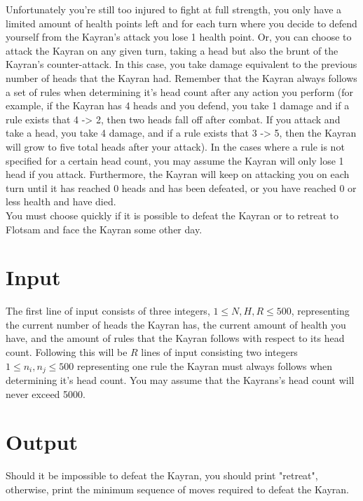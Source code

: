 \noindent Unfortunately you're still too injured to fight at full strength, you only have a limited amount of health
points left and for each turn where you decide to defend yourself from the Kayran's attack you lose 1 health point. Or,
you can choose to attack the Kayran on any given turn, taking a head but also the brunt of the Kayran's counter-attack.
In this case, you take damage equivalent to the previous number of heads that the Kayran had. Remember that the Kayran
always follows a set of rules when determining it's head count after any action you perform (for example, if the Kayran
has 4 heads and you defend, you take 1 damage and if a rule exists that 4 -> 2, then two heads fall off after combat.
If you attack and take a head, you take 4 damage, and if a rule exists that 3 -> 5, then the Kayran will grow to five
total heads after your attack). In the cases where a rule is not specified for a certain head count, you may assume the
Kayran will only lose 1 head if you attack. Furthermore, the Kayran will keep on attacking you on each turn until it has
reached 0 heads and has been defeated, or you have reached 0 or less health and have died. \\

\noindent You must choose quickly if it is possible to defeat the Kayran or to retreat to Flotsam and face the Kayran
some other day.\\

\section*{Input}

The first line of input consists of three integers, $1 \leq N, H, R \leq 500$, representing the current number of heads
the Kayran has, the current amount of health you have, and the amount of rules that the Kayran follows with respect to
its head count. Following this will be $R$ lines of input consisting two integers $1 \leq n_i , n_j \leq 500$
representing one rule the Kayran must always follows when determining it's head count. You may assume that the Kayrans's
head count will never exceed 5000. \\

\section*{Output}
Should it be impossible to defeat the Kayran, you should print "retreat", otherwise, print the minimum sequence of 
moves required to defeat the Kayran. \\

